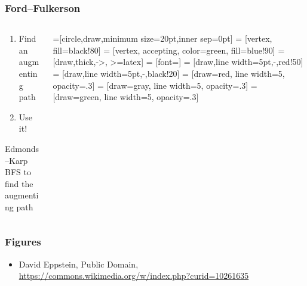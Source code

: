 	\begin{frame}[fragile]
	\frametitle{Ford--Fulkerson}
	\begin{columns}
		\begin{column}{0.45\textwidth}
	\begin{enumerate}
		\item
		  Find an augmenting path
	\item
		  Use it!
	\end{enumerate}
	\begin{block}{Edmonds--Karp}
	BFS to find the augmenting path
	\end{block}
	\end{column}
	\begin{column}{0.45\textwidth}
		=[circle,draw,minimum size=20pt,inner sep=0pt]
	 = [vertex, fill=black!80]
	 = [vertex, accepting, color=green, fill=blue!90]
	 = [draw,thick,->, >=latex]
	 = [font=\small]
	 = [draw,line width=5pt,-,red!50]
	 = [draw,line width=5pt,-,black!20]
     = [draw=red, line width=5,  opacity=.3]
     = [draw=gray, line width=5, opacity=.3]
     = [draw=green, line width=5, opacity=.3]

	\end{column}
	\end{columns}
	\end{frame}

\begin{frame}[fragile]
	\frametitle{Figures}

	\begin{itemize}
		\item
		      David Eppstein, Public Domain, \url{https://commons.wikimedia.org/w/index.php?curid=10261635}
	\end{itemize}
\end{frame}


